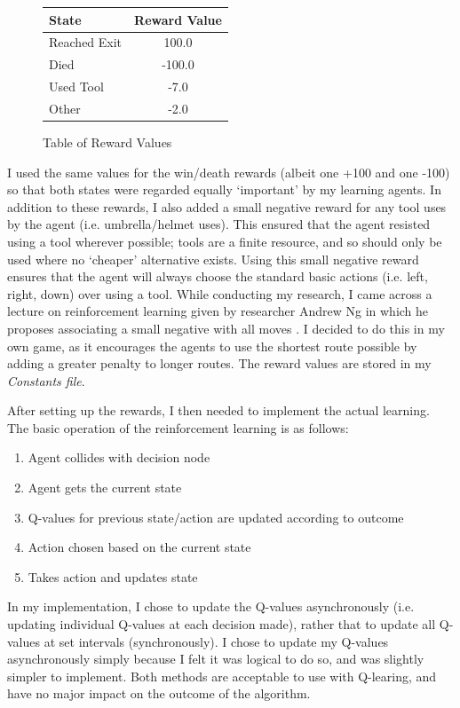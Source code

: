 \documentclass[a4paper,oneside]{report}
\begin{document}
\begin{figure}[h!]
\centering
\begin{tabular}{| l | c |}
  \hline
  State  & Reward Value \\
  \hline
  Reached Exit    &  100.0 \\
  Died   		  &  -100.0 \\
  Used Tool       &  -7.0 \\
  Other  		  &  -2.0 \\
  \hline
\end{tabular}
\caption{Table of Reward Values}
\end{figure}

I used the same values for the win/death rewards (albeit one +100 and one -100) so that both states were regarded equally `important' by my learning agents. In addition to these rewards, I also added a small negative reward for any tool uses by the agent (i.e. umbrella/helmet uses). This ensured that the agent resisted using a tool wherever possible; tools are a finite resource, and so should only be used where no `cheaper' alternative exists. Using this small negative reward ensures that the agent will always choose the standard basic actions (i.e. left, right, down) over using a tool. While conducting my research, I came across a lecture on reinforcement learning given by researcher Andrew Ng in which he proposes associating a small negative with all moves \cite{Ng:uq}. I decided to do this in my own game, as it encourages the agents to use the shortest route possible by adding a greater penalty to longer routes. The reward values are stored in my \emph{Constants file}.

After setting up the rewards, I then needed to implement the actual learning. The basic operation of the reinforcement learning is as follows:

\begin{enumerate}
	\item Agent collides with decision node
	\item Agent gets the current state
	\item Q-values for previous state/action are updated according to outcome
	\item Action chosen based on the current state
	\item Takes action and updates state
\end{enumerate}

In my implementation, I chose to update the Q-values asynchronously (i.e. updating individual Q-values at each decision made), rather that to update all Q-values at set intervals (synchronously). I chose to update my Q-values asynchronously simply because I felt it was logical to do so, and was slightly simpler to implement. Both methods are acceptable to use with Q-learing, and have no major impact on the outcome of the algorithm.
\end{document}
